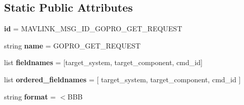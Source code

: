 \subsection*{Static Public Attributes}
\begin{DoxyCompactItemize}
\item 
\mbox{\label{classpymavlink_1_1dialects_1_1v10_1_1MAVLink__gopro__get__request__message_aa7f00efeea36c0b26caf2c656f06008b}} 
{\bfseries id} = M\+A\+V\+L\+I\+N\+K\+\_\+\+M\+S\+G\+\_\+\+I\+D\+\_\+\+G\+O\+P\+R\+O\+\_\+\+G\+E\+T\+\_\+\+R\+E\+Q\+U\+E\+ST
\item 
\mbox{\label{classpymavlink_1_1dialects_1_1v10_1_1MAVLink__gopro__get__request__message_a4fd462f2c39a6bac566283ae47e88909}} 
string {\bfseries name} = \textquotesingle{}G\+O\+P\+R\+O\+\_\+\+G\+E\+T\+\_\+\+R\+E\+Q\+U\+E\+ST\textquotesingle{}
\item 
\mbox{\label{classpymavlink_1_1dialects_1_1v10_1_1MAVLink__gopro__get__request__message_a68f8db493e3a8b3132fd0be3da178b6f}} 
list {\bfseries fieldnames} = \mbox{[}\textquotesingle{}target\+\_\+system\textquotesingle{}, \textquotesingle{}target\+\_\+component\textquotesingle{}, \textquotesingle{}cmd\+\_\+id\textquotesingle{}\mbox{]}
\item 
\mbox{\label{classpymavlink_1_1dialects_1_1v10_1_1MAVLink__gopro__get__request__message_a20654521bc2fdcb3dea60fc5b9c7262b}} 
list {\bfseries ordered\+\_\+fieldnames} = \mbox{[} \textquotesingle{}target\+\_\+system\textquotesingle{}, \textquotesingle{}target\+\_\+component\textquotesingle{}, \textquotesingle{}cmd\+\_\+id\textquotesingle{} \mbox{]}
\item 
\mbox{\label{classpymavlink_1_1dialects_1_1v10_1_1MAVLink__gopro__get__request__message_aacf51c7f28bfc608d606d65596108694}} 
string {\bfseries format} = \textquotesingle{}$<$B\+BB\textquotesingle{}
\item 
\mbox{\label{classpymavlink_1_1dialects_1_1v10_1_1MAVLink__gopro__get__request__message_a71f3c511596f30bf471dd2b4598444ee}} 

\end{DoxyCompactItemize}

